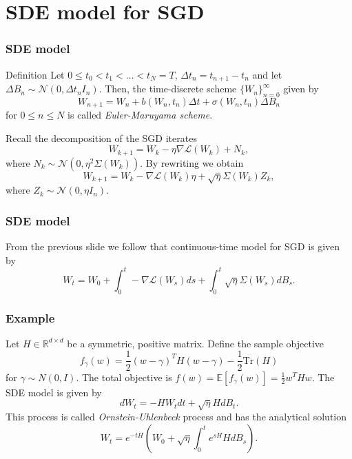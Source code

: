 \documentclass[17pt,institute=e10]{tuhh_presentation}
\newcommand{\CL}{\mathcal{L}}
\newcommand{\E}[1]{\mathbb{E}\left[{#1} \right]}
\begin{document}
\section{SDE model for SGD}
\begin{frame}
  \frametitle{SDE model}
  \begin{block}{Definition \autocite{kloedenNumericalSolutionStochastic2013}}
    Let $0 \leq t_0 < t_1 < \dots < t_N = T$, $\Delta t_n = t_{n+1} - t_n$ and let $\Delta B_n \sim \mathcal{N}(0,\Delta t_n I_n)$. Then, the time-discrete scheme $\{W_n\}_{n=0}^\infty$ given by
\begin{equation*}
  W_{n+1} = W_n + b(W_n, t_n)\Delta t + \sigma(W_n, t_n) \Delta B_n
\end{equation*}
for $0 \leq n \leq N$ is called \emph{\textcolor{purple-pontifex}{Euler-Maruyama scheme}}.
  \end{block}
  Recall the decomposition of the SGD iterates
  \begin{equation*}
    W_{k+1} = W_k - \eta \nabla \CL(W_k) + N_k,
  \end{equation*}
  where $N_k \sim \mathcal{N}(0, \eta^2\Sigma(W_k))$. By rewriting we obtain
  \begin{equation*}
    W_{k+1} = W_k - \nabla \CL(W_k) \eta + \sqrt{\eta}\Sigma(W_k) Z_k,
  \end{equation*}
  where $Z_k \sim \mathcal{N}(0, \eta I_n)$.
\end{frame}
\begin{frame}
  \frametitle{SDE model}
  From the previous slide we follow that \textcolor{purple-pontifex}{continuous-time} model for SGD is given by
  \begin{equation*}
    W_t = W_0 + \int_0^t -\nabla  \CL(W_s) ds + \int_0^t \sqrt{\eta} \Sigma(W_s) dB_s.
  \end{equation*}
\end{frame}
\begin{frame}
  \frametitle{Example \autocite{liStochasticModifiedEquations2019}}
  Let $H \in \mathbb{R}^{d\times d}$ be a symmetric, positive matrix. Define the sample objective 
\begin{equation*}
  f_{\gamma}(w) = \frac{1}{2} (w - \gamma)^T H (w - \gamma) - \frac{1}{2} \text{Tr}(H)
\end{equation*}
for $\gamma \sim N(0,I)$. The total objective is $f(w) = \E{f_{\gamma}(w)} = \frac{1}{2} w^T H w$.
The SDE model is given by
\begin{equation*}
  dW_t = -H W_t dt + \sqrt{\eta}H dB_t.
\end{equation*}
This process is called \emph{Ornstein-Uhlenbeck} process and has the analytical solution
\begin{equation*}
  W_t = e^{-t H}(W_0 + \sqrt{\eta}\int_0^te^{s H}H dB_s).
\end{equation*}
\end{frame}
\end{document}
